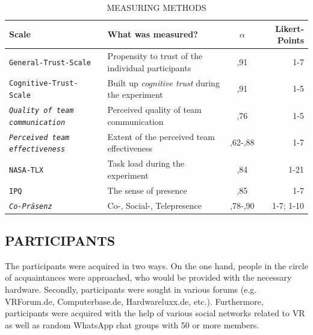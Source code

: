 \documentclass[sigchi]{acmart}
\begin{document}
\begin{table}
  \caption{MEASURING METHODS}
  \label{tab:commands}
  \begin{tabular}{llcr}
    \toprule
    Scale & What was measured? & $\alpha$ & Likert-Points \\
    \midrule
    \texttt{General-Trust-Scale \citep{couch1996assessment}} & Propensity to trust of the individual participants & ,91 & 1-7 \\
    
    \texttt{Cognitive-Trust-Scale \citep[S. 37]{mcallister1995affect}} &Built up \textit{cognitive trust} during the experiment & ,91 & 1-5\\
    
     \texttt{\textit{Quality of team communication} \citep[S. 1049]{gonzalez2014climate}} & Perceived quality of team communication & ,76 & 1-5 \\
     
      \texttt{\textit{Perceived team effectiveness}\citep[S. 469]{gibson2003team}} & Extent of the perceived team effectiveness & ,62-,88 & 1-7\\
          
       \texttt{NASA-TLX\citep{NASATLX}} & Task load during the experiment & ,84 &1-21  \\
       
       \texttt{IPQ \citep{IPQ}} & The sense of presence & ,85 & 1-7 \\
       
        \texttt{\textit{Co-Präsenz} \citep[S. 487]{nowak2003effect}} &  Co-, Social-, Telepresence & ,78-,90 & 1-7; 1-10 \\
    \bottomrule
  \end{tabular}
\end{table}

\subsection{PARTICIPANTS}

The participants were acquired in two ways. On the one hand, people in the circle of acquaintances were approached, who would be provided with the necessary hardware. Secondly, participants were sought in various forums (e.g. VRForum.de, Computerbase.de, Hardwareluxx.de, etc.). Furthermore, participants were acquired with the help of various social networks related to VR as well as random WhatsApp chat groups with 50 or more members.
\end{document}
